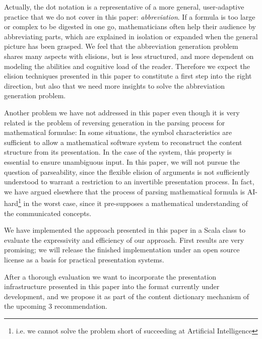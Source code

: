 \documentclass[a4paper]{article}
\begin{document}
Actually, the dot notation is a representative of a more general, user-adaptive practice
that we do not cover in this paper: {\emph{abbreviation}}. If a formula is too large or
complex to be digested in one go, mathematicians often help their audience by abbreviating
parts, which are explained in isolation or expanded when the general picture has been
grasped. We feel that the abbreviation generation problem shares many aspects with
elisions, but is less structured, and more dependent on modeling the abilities and
cognitive load of the reader. Therefore we expect the elision techniques presented in this
paper to constitute a first step into the right direction, but also that we need more
insights to solve the abbreviation generation problem.

Another problem we have not addressed in this paper even though it is very related is the
problem of reversing generation in the parsing process for mathematical formulae: In some situations, the symbol
characteristics are sufficient to allow a mathematical software system to reconstruct the
content structure from its presentation. In the case of the {\isabelle} system, this
property is essential to ensure unambiguous input. In this paper, we will not pursue the
question of parseability, since the flexible elision of arguments is not sufficiently
understood to warrant a restriction to an invertible presentation process. In fact, we
have argued elsewhere\cite{Kohlhase04:stex} that the process of parsing mathematical
formula is AI-hard\footnote{i.e. we cannot solve the problem short of succeeding at
  Artificial Intelligence} in the worst case, since it pre-supposes a mathematical
understanding of the communicated concepts.

We have implemented the approach presented in this paper in a Scala class to evaluate the expressivity and efficiency of our approach.
First results are very promising; we will release the finished implementation under an
open source license as a basis for practical presentation systems.

After a thorough evaluation we want to incorporate the presentation infrastructure
presented in this paper into the {} format currently under development, and we
propose it as part of the content dictionary mechanism of the upcoming {\mathml}3
recommendation.


\begin{footnotesize}
 

\end{footnotesize}
\end{document}
